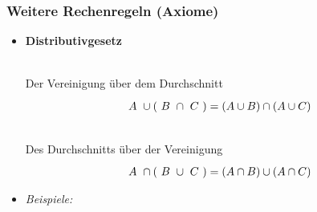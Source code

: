             \subsubsection{Weitere Rechenregeln (Axiome)} 
                \begin{itemize}[leftmargin=*]
                    \item \textbf{Distributivgesetz} \\
                    \begin{minipage}{0.5\columnwidth}
                        ~ \\
                        Der Vereinigung über  dem Durchschnitt
                        \begin{equation*}
                            \tikz[baseline]{\node[anchor=base] (t1) {$ A$};} \cup (
                            \tikz[baseline]{\node[anchor=base] (t2) {$B$}; } \cap
                            \tikz[baseline]{\node[anchor=base] (t3) {$C$}; } ) = (A\cup B) \cap (A\cup C)
                        \end{equation*}
                    \end{minipage}
                    \begin{minipage}{0.5\columnwidth}
                        ~ \\
                        Des Durchschnitts über der Vereinigung
                        \begin{equation*}
                            \tikz[baseline]{\node[anchor=base] (t1) {$ A$};} \cap (
                            \tikz[baseline]{\node[anchor=base] (t2) {$B$}; } \cup
                            \tikz[baseline]{\node[anchor=base] (t3) {$C$}; } ) = (A\cap B) \cup (A\cap C)
                        \end{equation*}
                    \end{minipage}
                    \item[] \textit{Beispiele:}

\end{itemize}
